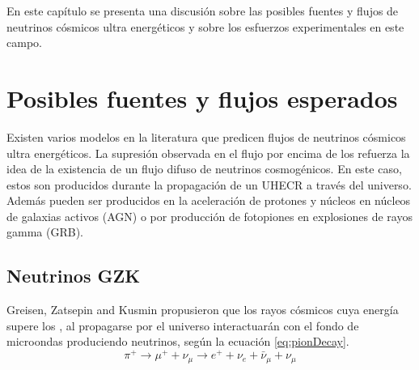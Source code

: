 En este cap\'itulo se presenta una discusi\'on sobre las posibles fuentes y flujos de neutrinos c\'osmicos ultra energ\'eticos 
y sobre los esfuerzos experimentales en este campo.

\section{Posibles fuentes y flujos esperados}

Existen varios modelos en la literatura que predicen flujos de neutrinos c\'osmicos ultra energ\'eticos.
La supresi\'on observada en el flujo por encima de los  refuerza la idea de la existencia de un flujo difuso de neutrinos cosmog\'enicos.
En este caso, estos son producidos durante la propagaci\'on de un UHECR a trav\'es del universo. 
Adem\'as pueden ser producidos en la aceleraci\'on de protones y n\'ucleos en n\'ucleos de galaxias activos (AGN)\cite{cite:nuAGN} o por producci\'on de fotopiones en explosiones de rayos gamma (GRB)\cite{cite:nuGRB}.


	\subsection{Neutrinos GZK}
	\label{sbsc:introGZK}
	Greisen, Zatsepin and Kusmin propusieron que los rayos c\'osmicos cuya energ\'ia supere los , al propagarse por el universo interactuar\'an con el fondo de microondas produciendo neutrinos, seg\'un la ecuaci\'on \ref{eq:pionDecay}.
	\begin{equation}\label{eq:pionDecay}
	\pi^{+} \rightarrow \mu^{+}+ \nu_{\mu} \rightarrow e^{+} + \nu_{e} + \bar{\nu}_{\mu} + \nu_{\mu}
	\end{equation}
	
